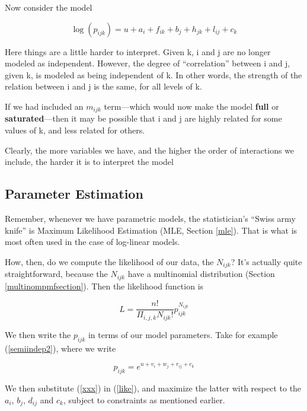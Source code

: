 Now consider the model

\begin{equation}
\label{harder}
\log(p_{ijk}) =
u + a_i + f_{ik} + b_j + h_{jk} + l_{ij} + c_k 
\end{equation}

Here things are a little harder to interpret.  Given k, i and j are no
longer modeled as independent.  However, the degree of ``correlation''
between i and j, given k, is modeled as being independent of k.  In
other words, the strength of the relation between i and j is the same,
for all levels of k.

If we had included an $m_{ijk}$ term---which would now make the model
{\bf full} or {\bf saturated}---then it may be possible that i and j are
highly related for some values of k, and less related for others.

Clearly, the more variables we have, and the higher the order of
interactions we include, the harder it is to interpret the model

\subsection{Parameter Estimation}

Remember, whenever we have parametric models, the statistician's ``Swiss
army knife'' is Maximum Likelihood Estimation (MLE, Section \ref{mle}).
That is what is most often used in the case of log-linear models.

How, then, do we compute the likelihood of our data, the $N_{ijk}$?
It's actually quite straightforward, because the $N_{ijk}$ have a
multinomial distribution (Section \ref{multinompmfsection}).  Then the
likelihood function is

\begin{equation}
\label{like}
L =
\frac
{n!}
{\Pi_{i,j,k} N_{ijk}!}
p_{ijk}^{N_{ijk}}
\end{equation}

We then write the $p_{ijk}$ in terms of our model parameters.
Take for example (\ref{semiindep2}), where we write

\begin{equation}
\label{xxx}
p_{ijk} 
= e^{u + v_i + w_j + r_{ij} + c_k} 
\end{equation}

We then substitute (\ref{xxx}) in (\ref{like}), and maximize the latter
with respect to the $a_i$, $b_j$, $d_{ij}$ and $c_k$, subject to
constraints as mentioned earlier.

